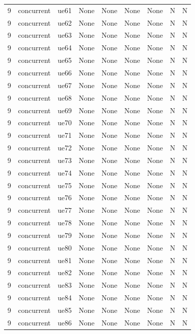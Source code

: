 \begin{table}[ht]
\begin{tabular}{|c|c|c|c|c|c|c|c|c|}
9 & concurrent & ue61 & None & None & None & None & N & N \\
9 & concurrent & ue62 & None & None & None & None & N & N \\
9 & concurrent & ue63 & None & None & None & None & N & N \\
9 & concurrent & ue64 & None & None & None & None & N & N \\
9 & concurrent & ue65 & None & None & None & None & N & N \\
9 & concurrent & ue66 & None & None & None & None & N & N \\
9 & concurrent & ue67 & None & None & None & None & N & N \\
9 & concurrent & ue68 & None & None & None & None & N & N \\
9 & concurrent & ue69 & None & None & None & None & N & N \\
9 & concurrent & ue70 & None & None & None & None & N & N \\
9 & concurrent & ue71 & None & None & None & None & N & N \\
9 & concurrent & ue72 & None & None & None & None & N & N \\
9 & concurrent & ue73 & None & None & None & None & N & N \\
9 & concurrent & ue74 & None & None & None & None & N & N \\
9 & concurrent & ue75 & None & None & None & None & N & N \\
9 & concurrent & ue76 & None & None & None & None & N & N \\
9 & concurrent & ue77 & None & None & None & None & N & N \\
9 & concurrent & ue78 & None & None & None & None & N & N \\
9 & concurrent & ue79 & None & None & None & None & N & N \\
9 & concurrent & ue80 & None & None & None & None & N & N \\
9 & concurrent & ue81 & None & None & None & None & N & N \\
9 & concurrent & ue82 & None & None & None & None & N & N \\
9 & concurrent & ue83 & None & None & None & None & N & N \\
9 & concurrent & ue84 & None & None & None & None & N & N \\
9 & concurrent & ue85 & None & None & None & None & N & N \\
9 & concurrent & ue86 & None & None & None & None & N & N \\

\end{tabular}
\end{table}
